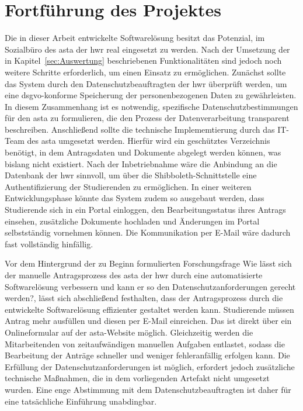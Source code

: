 \section{Fortführung des Projektes}
Die in dieser Arbeit entwickelte Softwarelösung besitzt das Potenzial, im Sozialbüro des \gls{asta} der \gls{hwr} real eingesetzt zu werden. Nach der Umsetzung der in Kapitel~\ref{sec:Auswertung} beschriebenen Funktionalitäten sind jedoch noch weitere Schritte erforderlich, um einen Einsatz zu ermöglichen. Zunächst sollte das System durch den Datenschutzbeauftragten der \gls{hwr} überprüft werden, um eine \gls{dsgvo}-konforme Speicherung der personenbezogenen Daten zu gewährleisten. In diesem Zusammenhang ist es notwendig, spezifische Datenschutzbestimmungen für den \gls{asta} zu formulieren, die den Prozess der Datenverarbeitung transparent beschreiben. Anschließend sollte die technische Implememtierung durch das IT-Team des \gls{asta} umgesetzt werden. Hierfür wird ein geschütztes Verzeichnis benötigt, in dem Antragsdaten und Dokumente abgelegt werden können, was bislang nicht existiert. Nach der Inbetriebnahme wäre die Anbindung an die Datenbank der \gls{hwr} sinnvoll, um über die Shibboleth-Schnittstelle eine Authentifizierung der Studierenden zu ermöglichen. In einer weiteren Entwicklungsphase könnte das System zudem so ausgebaut werden, dass Studierende sich in ein Portal einloggen, den Bearbeitungsstatus ihres Antrags einsehen, zusätzliche Dokumente hochladen und Änderungen im Portal selbstständig vornehmen können. Die Kommunikation per E-Mail wäre dadurch fast vollständig hinfällig. 

Vor dem Hintergrund der zu Beginn formulierten Forschungsfrage \glqq{}Wie lässt sich der manuelle Antragsprozess des \gls{asta} der \gls{hwr} durch eine automatisierte Softwarelösung verbessern und kann er so den Datenschutzanforderungen gerecht werden?\grqq{}, lässt sich abschließend festhalten, dass der Antragsprozess durch die entwickelte Softwarelösung effizienter gestaltet werden kann. Studierende müssen Antrag mehr ausfüllen und diesen per E-Mail einreichen. Das ist direkt über ein Onlineformular auf der \gls{asta}-Website möglich. Gleichzeitig werden die Mitarbeitenden von zeitaufwändigen manuellen Aufgaben entlastet, sodass die Bearbeitung der Anträge schneller und weniger fehleranfällig erfolgen kann. Die Erfüllung der Datenschutzanforderungen ist möglich, erfordert jedoch zusätzliche technische Maßnahmen, die in dem vorliegenden Artefakt nicht umgesetzt wurden. Eine enge Abstimmung mit dem Datenschutzbeauftragten ist daher für eine tatsächliche Einführung unabdingbar.